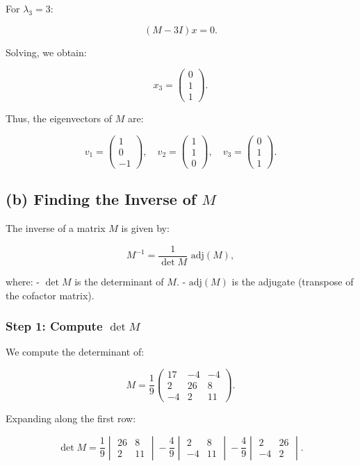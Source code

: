 \documentclass[12pt]{article}
\begin{document}
For \( \lambda_3 = 3 \):

\[
(M - 3I)x = 0.
\]

Solving, we obtain:

\[
x_3 =
\begin{pmatrix}
0 \\ 1 \\ 1
\end{pmatrix}.
\]

Thus, the eigenvectors of \( M \) are:

\[
v_1 =
\begin{pmatrix}
1 \\ 0 \\ -1
\end{pmatrix}, \quad
v_2 =
\begin{pmatrix}
1 \\ 1 \\ 0
\end{pmatrix}, \quad
v_3 =
\begin{pmatrix}
0 \\ 1 \\ 1
\end{pmatrix}.
\]

\subsection*{(b) Finding the Inverse of \( M \)}

The inverse of a matrix \( M \) is given by:

\[
M^{-1} = \frac{1}{\det M} \text{ adj}(M),
\]

where:
- \( \det M \) is the determinant of \( M \).
- \( \text{adj}(M) \) is the adjugate (transpose of the cofactor matrix).

\subsubsection*{Step 1: Compute \( \det M \)}

We compute the determinant of:

\[
M =
\frac{1}{9}
\begin{pmatrix}
17 & -4 & -4 \\
2 & 26 & 8 \\
-4 & 2 & 11
\end{pmatrix}.
\]

Expanding along the first row:

\[
\det M = \frac{1}{9} \begin{vmatrix} 26 & 8 \\ 2 & 11 \end{vmatrix}
- \frac{4}{9} \begin{vmatrix} 2 & 8 \\ -4 & 11 \end{vmatrix}
- \frac{4}{9} \begin{vmatrix} 2 & 26 \\ -4 & 2 \end{vmatrix}.
\]
\end{document}
